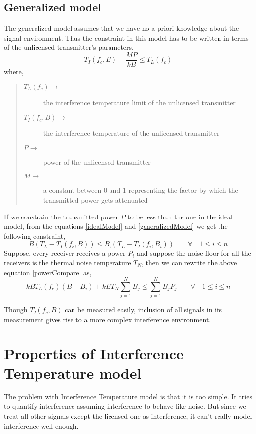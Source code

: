 \documentclass[12pt]{article}
\begin{document}
\subsection{Generalized model}

The generalized model assumes that we have no a priori knowledge about the signal environment. Thus the constraint in this model has to be written in terms of the unlicensed transmitter's parameters.
\begin{equation}
    T_I(f_c,B) + \frac{MP}{kB} \leq T_L(f_c) \label{generalizedModel}
\end{equation}
where,
\begin{quote}
\begin{description}
    \item[$T_L(f_c)\longrightarrow$] the interference temperature limit of the unlicensed transmitter
    \item[$T_I(f_c,B)\longrightarrow$] the interference temperature of the unlicensed transmitter
    \item[$P\longrightarrow$] power of the unlicensed transmitter
    \item[$M\longrightarrow$] a constant between 0 and 1 representing the factor by which the transmitted power gets attenuated
\end{description}
\end{quote}

If we constrain the transmitted power $P$ to be less than the one in the ideal model, from the equations \eqref{idealModel} and \eqref{generalizedModel} we get the following constraint,
\begin{equation}
    B(T_L - T_I(f_c,B)) \leq  B_i(T_L - T_I(f_i,B_i)) \qquad \forall \quad 1 \leq i \leq n \label{powerCompare}
\end{equation}
Suppose, every receiver receives a power $P_i$ and suppose the noise floor for all the receivers is the thermal noise temperature $T_N$, then we can rewrite the above equation \eqref{powerCompare} as,
\begin{equation}
    kBT_L(f_c)(B-B_i) + kBT_N\sum_{j=1}^{N}B_j \leq \sum_{j=1}^{N}B_jP_j \qquad \forall \quad 1 \leq i\leq n
\end{equation}

Though $T_I(f_c,B)$ can be measured easily, inclusion of all signals in its measurement gives rise to a more complex interference environment.


\section{Properties of Interference Temperature model}

The problem with Interference Temperature model is that it is too simple. It tries to quantify interference assuming interference to behave like noise. But since we treat all other signals except the licensed one as interference, it can't really model interference well enough.
\end{document}
